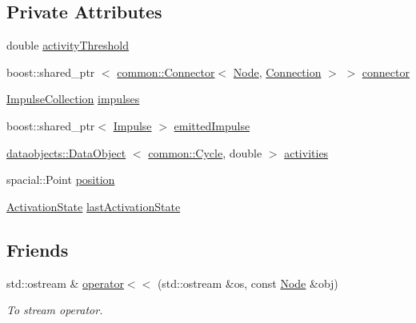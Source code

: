 \subsection*{\-Private \-Attributes}
\begin{DoxyCompactItemize}
\item 
double \hyperlink{classcryomesh_1_1components_1_1Node_a270451d7286a4e6f344559a3d48d1193}{activity\-Threshold}
\item 
boost\-::shared\-\_\-ptr\*
$<$ \hyperlink{classcryomesh_1_1common_1_1Connector}{common\-::\-Connector}$<$ \hyperlink{classcryomesh_1_1components_1_1Node}{\-Node}, \*
\hyperlink{classcryomesh_1_1components_1_1Connection}{\-Connection} $>$ $>$ \hyperlink{classcryomesh_1_1components_1_1Node_a43b68f9f1a83bca4d4fc4f55bb8dd8de}{connector}
\item 
\hyperlink{classcryomesh_1_1components_1_1ImpulseCollection}{\-Impulse\-Collection} \hyperlink{classcryomesh_1_1components_1_1Node_a8e9ae8373052bb63f2f1e6e453a3c18d}{impulses}
\item 
boost\-::shared\-\_\-ptr$<$ \hyperlink{classcryomesh_1_1components_1_1Impulse}{\-Impulse} $>$ \hyperlink{classcryomesh_1_1components_1_1Node_a6b5e004fc2bbdbd8ec7173b44af8ffe5}{emitted\-Impulse}
\item 
\hyperlink{classcryomesh_1_1dataobjects_1_1DataObject}{dataobjects\-::\-Data\-Object}\*
$<$ \hyperlink{classcryomesh_1_1common_1_1Cycle}{common\-::\-Cycle}, double $>$ \hyperlink{classcryomesh_1_1components_1_1Node_a39bf3a9c006d8ee03769d6b86127e7cf}{activities}
\item 
spacial\-::\-Point \hyperlink{classcryomesh_1_1components_1_1Node_afad345a6d8cc1eacc555acde8c065b61}{position}
\item 
\hyperlink{classcryomesh_1_1components_1_1Node_a291becdd589b5bd338d5c0dd28199798}{\-Activation\-State} \hyperlink{classcryomesh_1_1components_1_1Node_ab94a09be9e58cc248f9d62ed5c45c83d}{last\-Activation\-State}
\end{DoxyCompactItemize}
\subsection*{\-Friends}
\begin{DoxyCompactItemize}
\item 
std\-::ostream \& \hyperlink{classcryomesh_1_1components_1_1Node_aa13c716dda529b01000661b942327bd6}{operator$<$$<$} (std\-::ostream \&os, const \hyperlink{classcryomesh_1_1components_1_1Node}{\-Node} \&obj)
\begin{DoxyCompactList}\small\item\em \-To stream operator. \end{DoxyCompactList}\end{DoxyCompactItemize}


